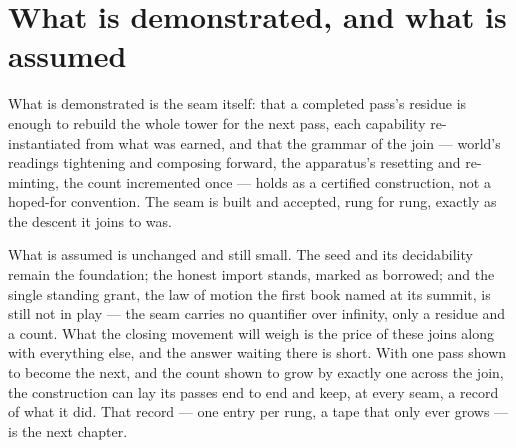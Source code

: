 \section{What is demonstrated, and what is assumed}
\label{se:demonstrated-assumed-III2}

What is demonstrated is the seam itself: that a completed pass's residue is enough to rebuild the whole
tower for the next pass, each capability re-instantiated from what was earned, and that the grammar of the
join --- world's readings tightening and composing forward, the apparatus's resetting and re-minting, the
count incremented once --- holds as a certified construction, not a hoped-for convention. The seam is built
and accepted, rung for rung, exactly as the descent it joins to was.

What is assumed is unchanged and still small. The seed and its decidability remain the foundation; the
honest import stands, marked as borrowed; and the single standing grant, the law of motion the first book
named at its summit, is still not in play --- the seam carries no quantifier over infinity, only a residue
and a count. What the closing movement will weigh is the price of these joins along with everything else,
and the answer waiting there is short. With one pass shown to become the next, and the count shown to grow
by exactly one across the join, the construction can lay its passes end to end and keep, at every seam, a
record of what it did. That record --- one entry per rung, a tape that only ever grows --- is the next
chapter.
